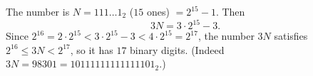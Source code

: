 The number is $N=111\ldots1_2$ ($15$ ones) $=2^{15}-1$. Then
\[
3N=3\cdot2^{15}-3 .
\]
Since $2^{16}=2\cdot2^{15}<3\cdot2^{15}-3<4\cdot2^{15}=2^{17}$, the number $3N$ satisfies $2^{16}\le3N<2^{17}$, so it has $\boxed{17}$ binary digits. (Indeed $3N=98301=10111111111111101_2$.)
